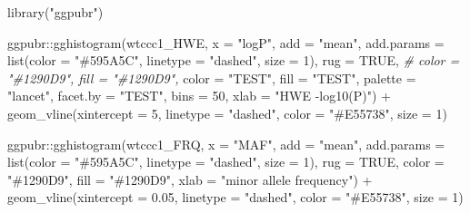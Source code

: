 \documentclass[
]{book}
\newenvironment{Shaded}{\begin{snugshade}}{\end{snugshade}}
\newcommand{\AttributeTok}[1]{\textcolor[rgb]{0.77,0.63,0.00}{#1}}
\newcommand{\CommentTok}[1]{\textcolor[rgb]{0.56,0.35,0.01}{\textit{#1}}}
\newcommand{\ConstantTok}[1]{\textcolor[rgb]{0.00,0.00,0.00}{#1}}
\newcommand{\DecValTok}[1]{\textcolor[rgb]{0.00,0.00,0.81}{#1}}
\newcommand{\FloatTok}[1]{\textcolor[rgb]{0.00,0.00,0.81}{#1}}
\newcommand{\FunctionTok}[1]{\textcolor[rgb]{0.00,0.00,0.00}{#1}}
\newcommand{\NormalTok}[1]{#1}
\newcommand{\SpecialCharTok}[1]{\textcolor[rgb]{0.00,0.00,0.00}{#1}}
\newcommand{\StringTok}[1]{\textcolor[rgb]{0.31,0.60,0.02}{#1}}
\begin{document}
\begin{Shaded}
\begin{Highlighting}[]
\FunctionTok{library}\NormalTok{(}\StringTok{"ggpubr"}\NormalTok{)}

\NormalTok{ggpubr}\SpecialCharTok{::}\FunctionTok{gghistogram}\NormalTok{(wtccc1\_HWE, }\AttributeTok{x =} \StringTok{"logP"}\NormalTok{,}
                    \AttributeTok{add =} \StringTok{"mean"}\NormalTok{,}
                    \AttributeTok{add.params =} \FunctionTok{list}\NormalTok{(}\AttributeTok{color =} \StringTok{"\#595A5C"}\NormalTok{, }\AttributeTok{linetype =} \StringTok{"dashed"}\NormalTok{, }\AttributeTok{size =} \DecValTok{1}\NormalTok{),}
                    \AttributeTok{rug =} \ConstantTok{TRUE}\NormalTok{,}
                    \CommentTok{\# color = "\#1290D9", fill = "\#1290D9",}
                    \AttributeTok{color =} \StringTok{"TEST"}\NormalTok{, }\AttributeTok{fill =} \StringTok{"TEST"}\NormalTok{,}
                    \AttributeTok{palette =} \StringTok{"lancet"}\NormalTok{,}
                    \AttributeTok{facet.by =} \StringTok{"TEST"}\NormalTok{,}
                    \AttributeTok{bins =} \DecValTok{50}\NormalTok{,}
                    \AttributeTok{xlab =} \StringTok{"HWE {-}log10(P)"}\NormalTok{) }\SpecialCharTok{+}
  \FunctionTok{geom\_vline}\NormalTok{(}\AttributeTok{xintercept =} \DecValTok{5}\NormalTok{, }\AttributeTok{linetype =} \StringTok{"dashed"}\NormalTok{,}
                \AttributeTok{color =} \StringTok{"\#E55738"}\NormalTok{, }\AttributeTok{size =} \DecValTok{1}\NormalTok{)}
\end{Highlighting}
\end{Shaded}

\begin{Shaded}
\begin{Highlighting}[]
\NormalTok{ggpubr}\SpecialCharTok{::}\FunctionTok{gghistogram}\NormalTok{(wtccc1\_FRQ, }\AttributeTok{x =} \StringTok{"MAF"}\NormalTok{,}
                    \AttributeTok{add =} \StringTok{"mean"}\NormalTok{, }\AttributeTok{add.params =} \FunctionTok{list}\NormalTok{(}\AttributeTok{color =} \StringTok{"\#595A5C"}\NormalTok{, }\AttributeTok{linetype =} \StringTok{"dashed"}\NormalTok{, }\AttributeTok{size =} \DecValTok{1}\NormalTok{),}
                    \AttributeTok{rug =} \ConstantTok{TRUE}\NormalTok{,}
                    \AttributeTok{color =} \StringTok{"\#1290D9"}\NormalTok{, }\AttributeTok{fill =} \StringTok{"\#1290D9"}\NormalTok{,}
                    \AttributeTok{xlab =} \StringTok{"minor allele frequency"}\NormalTok{) }\SpecialCharTok{+}
  \FunctionTok{geom\_vline}\NormalTok{(}\AttributeTok{xintercept =} \FloatTok{0.05}\NormalTok{, }\AttributeTok{linetype =} \StringTok{"dashed"}\NormalTok{,}
                \AttributeTok{color =} \StringTok{"\#E55738"}\NormalTok{, }\AttributeTok{size =} \DecValTok{1}\NormalTok{)}
\end{Highlighting}
\end{Shaded}
\end{document}
